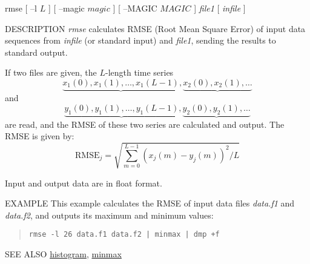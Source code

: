 \begin{synopsis}
\item [rmse] [ --l $L$ ] [ --magic $magic$ ] [ --MAGIC $MAGIC$ ] {\em file1} [ {\em infile} ]
\end{synopsis}

\begin{qsection}{DESCRIPTION}
{\em rmse} calculates RMSE (Root Mean Square Error) of input data sequences 
from {\em infile} (or standard input) and {\em file1}, 
sending the results to standard output.

If two files are given, the $L$-length time series 
\begin{displaymath}
  \underbrace{x_1(0),x_1(1),\dots,x_1(L-1)},\underbrace{x_2(0),x_2(1),\dots}
\end{displaymath}
and
\begin{displaymath}
  \underbrace{y_1(0),y_1(1),\dots,y_1(L-1)},\underbrace{y_2(0),y_2(1),\dots}
\end{displaymath}
are read,
and the RMSE of these two series are calculated and output.
 The RMSE is given by:
\begin{displaymath}
\mathrm{RMSE}_j = \sqrt{\sum_{m=0}^{L-1} (x_j(m)-y_j(m))^2/L}
\end{displaymath}

Input and output data are in float format.
\end{qsection}

\begin{options}
\end{options}

\begin{qsection}{EXAMPLE}
This example calculates the RMSE of input data files {\em data.f1} and {\em
data.f2}, and outputs its maximum and minimum values:
\begin{quote}
 \verb!rmse -l 26 data.f1 data.f2 | minmax | dmp +f!
\end{quote}
\end{qsection}

\begin{qsection}{SEE ALSO}
\hyperlink{histogram}{histogram},
\hyperlink{minmax}{minmax}
\end{qsection}
